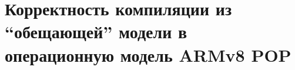 \chapter{Корректность компиляции из ``обещающей'' модели в операционную модель ARMv8 POP} \label{sec:armpop}
